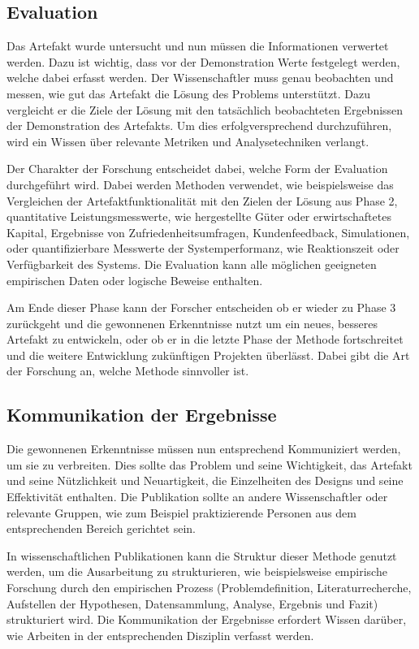 \subsection{Evaluation}

Das Artefakt wurde untersucht und nun müssen die Informationen verwertet werden. Dazu ist wichtig, dass vor der Demonstration Werte festgelegt werden, welche dabei erfasst werden. Der Wissenschaftler muss genau beobachten und messen, wie gut das Artefakt die Lösung des Problems unterstützt. Dazu vergleicht er die Ziele der Lösung mit den tatsächlich beobachteten Ergebnissen der Demonstration des Artefakts. Um dies erfolgversprechend durchzuführen, wird ein Wissen über relevante Metriken und Analysetechniken verlangt.

Der Charakter der Forschung entscheidet dabei, welche Form der Evaluation durchgeführt wird. Dabei werden Methoden verwendet, wie beispielsweise das Vergleichen der Artefaktfunktionalität mit den Zielen der Lösung aus Phase 2, quantitative Leistungsmesswerte, wie hergestellte Güter oder erwirtschaftetes Kapital, Ergebnisse von Zufriedenheitsumfragen, Kundenfeedback, Simulationen, oder quantifizierbare Messwerte der Systemperformanz, wie Reaktionszeit oder Verfügbarkeit des Systems. Die Evaluation kann alle möglichen geeigneten empirischen Daten oder logische Beweise enthalten.

Am Ende dieser Phase kann der Forscher entscheiden ob er wieder zu Phase 3 zurückgeht und die gewonnenen Erkenntnisse nutzt um ein neues, besseres Artefakt zu entwickeln, oder ob er in die letzte Phase der Methode fortschreitet und die weitere Entwicklung zukünftigen Projekten überlässt. Dabei gibt die Art der Forschung an, welche Methode sinnvoller ist.

\subsection{Kommunikation der Ergebnisse}

Die gewonnenen Erkenntnisse müssen nun entsprechend Kommuniziert werden, um sie zu verbreiten. Dies sollte das Problem und seine Wichtigkeit, das Artefakt und seine Nützlichkeit und Neuartigkeit, die Einzelheiten des Designs und seine Effektivität enthalten. Die Publikation sollte an andere Wissenschaftler oder relevante Gruppen, wie zum Beispiel praktizierende Personen aus dem entsprechenden Bereich gerichtet sein. 

In wissenschaftlichen Publikationen kann die Struktur dieser Methode genutzt werden, um die Ausarbeitung zu strukturieren, wie beispielsweise empirische Forschung durch den empirischen Prozess (Problemdefinition, Literaturrecherche, Aufstellen der Hypothesen, Datensammlung, Analyse, Ergebnis und Fazit) strukturiert wird. Die Kommunikation der Ergebnisse erfordert Wissen darüber, wie Arbeiten in der entsprechenden Disziplin verfasst werden. 


